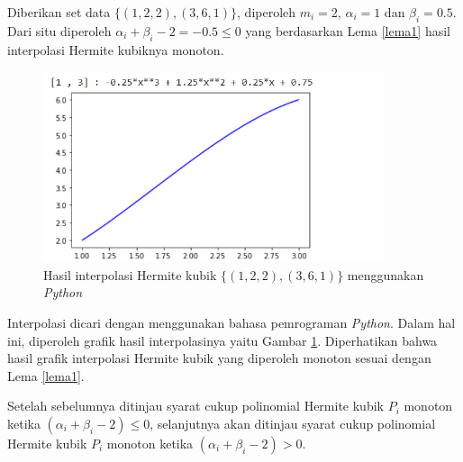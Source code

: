 \begin{contoh}
    Diberikan set data $\{(1,2,2),(3,6,1)\}$, diperoleh $m_i=2$, $\alpha_i=1$ dan $\beta_i=0.5$. Dari situ diperoleh $\alpha_i+\beta_i-2=-0.5\leq0$ yang berdasarkan Lema \ref{lema1} hasil interpolasi Hermite kubiknya monoton.
    \begin{figure}[H]
        \centering
        \includegraphics[width=10cm]{Images/contohLema1Hermite.png}
        \caption{Hasil interpolasi Hermite kubik $\{(1,2,2),(3,6,1)\}$ menggunakan \textit{Python}}
        \label{Gambar3.4}
    \end{figure}
    Interpolasi dicari dengan menggunakan bahasa pemrograman \textit{Python}. Dalam hal ini, diperoleh grafik hasil interpolasinya yaitu Gambar \ref{Gambar3.4}. Diperhatikan bahwa hasil grafik interpolasi Hermite kubik yang diperoleh monoton sesuai dengan Lema \ref{lema1}.
\end{contoh}

Setelah sebelumnya ditinjau syarat cukup polinomial Hermite kubik $P_i$ monoton ketika $(\alpha_i + \beta_i - 2) \leq 0$, selanjutnya akan ditinjau syarat cukup polinomial Hermite kubik $P_i$ monoton ketika $(\alpha_i + \beta_i - 2) > 0$.


